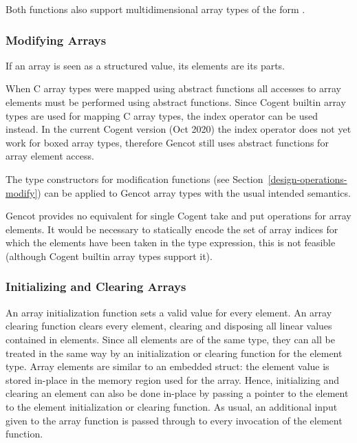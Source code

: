 Both functions also support multidimensional array types of the form .

\subsubsection{Modifying Arrays}

If an array is seen as a structured value, its elements are its parts.

When C array types were mapped using abstract functions all accesses to array elements 
must be performed using abstract functions. Since Cogent builtin array types are used for mapping C array types, 
the index operator  can be used instead. In the current Cogent version (Oct 2020) the index operator 
does not yet work for boxed array types, therefore Gencot still uses abstract functions for array element access.


The type constructors for modification functions (see Section~\ref{design-operations-modify}) can be applied to 
Gencot array types with the usual intended semantics. 

Gencot provides no equivalent for single Cogent take and put operations for array elements. It would be
necessary to statically encode the set of array indices for which the elements have been taken in the type expression,
this is not feasible (although Cogent builtin array types support it).

\subsubsection{Initializing and Clearing Arrays}

An array initialization function sets a valid value for every element. An array clearing function clears every element, 
clearing and disposing all linear values contained in elements. Since all elements are of the same type, they can all be
treated in the same way by an initialization or clearing function for the element type. Array elements are similar to
an embedded struct: the element value is stored in-place in the memory region used for the array. Hence, initializing and 
clearing an element can also be done in-place by passing a pointer to the element to the element initialization or 
clearing function. As usual, an additional input given to the array function is passed through to every invocation 
of the element function. 

